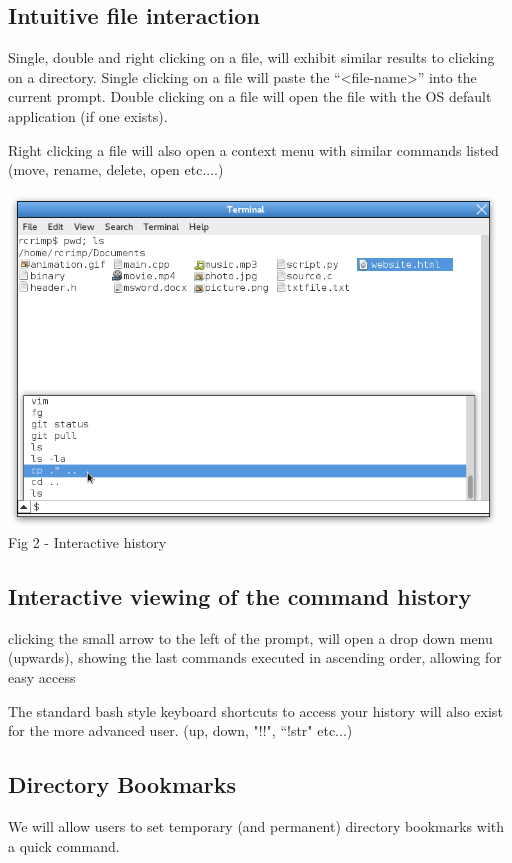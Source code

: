 \documentclass[a4paper,12pt]{article}
\begin{document}
\subsection*{Intuitive file interaction}
Single, double and right clicking on a file, will exhibit similar results to clicking on a directory.
Single clicking on a file will paste the ``\textless file-name\textgreater'' into the current prompt.
Double clicking on a file will open the file with the OS default application (if one exists).

Right clicking a file will also  open a context menu with similar commands listed (move, rename, delete, open etc....)

\begin{center}
  \includegraphics[width=13cm]{history2.png}\\
  \small Fig 2 - Interactive history
\end{center}

\subsection*{Interactive viewing of the command history}
clicking the small arrow to the left of the prompt, will open a drop down menu (upwards), showing the last commands executed in ascending order, allowing for easy access

The standard bash style keyboard shortcuts to access your history will also exist for the
more advanced user. (up, down, "!!", ``!str" etc...)

\subsection*{Directory Bookmarks}
We will allow users to set temporary (and permanent) directory bookmarks with a quick command.
\end{document}
